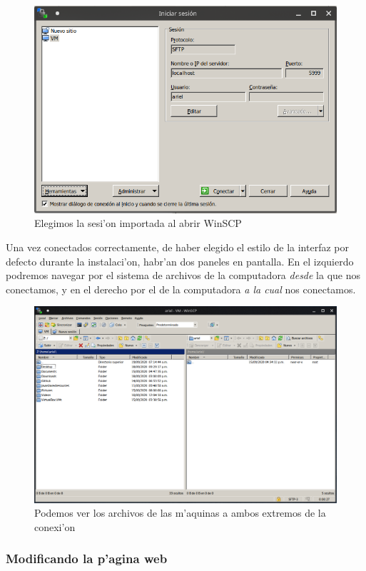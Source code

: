 \documentclass[11pt]{article}
\begin{document}
	\begin{figure}[H]
		\centering \captionsetup{justification=centering}
		\includegraphics[width=.8\linewidth]{Images/WinSCP/fig2}
		\caption{Elegimos la sesi'on importada al abrir WinSCP}
	\end{figure}

	Una vez conectados correctamente, de haber elegido el estilo de la interfaz por defecto durante la instalaci'on, habr'an dos paneles en pantalla. En el izquierdo podremos navegar por el sistema de archivos de la computadora \emph{desde} la que nos conectamos, y en el derecho por el de la computadora \emph{a la cual} nos conectamos.
	
	\begin{figure}[H]
		\centering \captionsetup{justification=centering}
		\includegraphics[width=.8\linewidth]{Images/WinSCP/fig3}
		\caption{Podemos ver los archivos de las m'aquinas a ambos extremos de la conexi'on}
	\end{figure}

	\subsubsection{Modificando la p'agina web}
\end{document}
